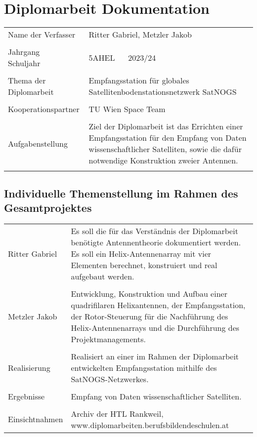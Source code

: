 \section *{Diplomarbeit Dokumentation}


\begin{tabular}{@{}p{5cm}p{8cm}}
	Name der Verfasser & Ritter Gabriel, Metzler Jakob \\ & \\
	
	Jahrgang ~\textbar~ Schuljahr & 5AHEL ~\textbar~ 2023/24\\ & \\
	
	Thema der Diplomarbeit & Empfangsstation für globales Satellitenbodenstationsnetzwerk SatNOGS \\ & \\
	
	Kooperationspartner & TU Wien Space Team\cite{noauthor_sts1_nodate} \\ & \\
	
	Aufgabenstellung & Ziel der Diplomarbeit ist das Errichten einer Empfangsstation für den Empfang von Daten wissenschaftlicher Satelliten, sowie die dafür notwendige Konstruktion zweier Antennen. \\ & \\
\end{tabular}

\pagebreak

\subsection *{Individuelle Themenstellung im Rahmen des Gesamtprojektes}
\begin{tabular}{@{}p{5cm}p{8cm}}
	
	Ritter Gabriel & Es soll die für das Verständnis der Diplomarbeit benötigte Antennentheorie dokumentiert werden. Es soll ein Helix-Antennenarray mit vier Elementen berechnet, konstruiert und real aufgebaut werden. \\ & \\
	
	Metzler Jakob & Entwicklung, Konstruktion und Aufbau einer quadrifilaren Helixantennen, der Empfangsstation, der Rotor-Steuerung für die Nachführung des Helix-Antennenarrays und die Durchführung des Projektmanagements.  \\ & \\
	
	Realisierung & Realisiert an einer im Rahmen der Diplomarbeit entwickelten Empfangsstation mithilfe des SatNOGS-Netzwerkes\cite{noauthor_satnogshomepage_nodate}. \\ & \\
	
	Ergebnisse & Empfang von Daten wissenschaftlicher Satelliten.\\ & \\
	
	Einsichtnahmen & Archiv der HTL Rankweil, \newline www.diplomarbeiten.berufsbildendeschulen.at \\
\end{tabular}
